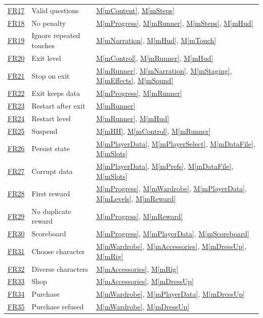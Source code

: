 \documentclass[12pt, titlepage]{article}
\newcommand{\mref}[1]{\hyperref[#1]{M\ref*{#1}}}
\newcommand{\srsurl}{https://team-hindsight.github.io/ophthamology-game/SRS/SRS.pdf}
\newcommand{\srsfrref}[2]{\href{\srsurl\#nameddest=#1}{FR#2}}
\begin{document}
\begin{longtable}{p{} p{} p{}}
\srsfrref{FR_ValidQuestions}{17} & Valid questions & \mref{mContent}, \mref{mSteps}\\
\srsfrref{FR_NoPenalty}{18} & No penalty & \mref{mProgress}, \mref{mRunner}, \mref{mSteps}, \mref{mHud}\\
\srsfrref{FR_IgnoreRepeatedTouches}{19} & Ignore repeated touches & \mref{mNarration}, \mref{mHud}, \mref{mTouch}\\
\srsfrref{FR_ExitLevel}{20} & Exit level & \mref{mControl}, \mref{mRunner}, \mref{mHud}\\
\srsfrref{FR_StopOnExit}{21} & Stop on exit & \mref{mRunner}, \mref{mNarration}, \mref{mStaging}, \mref{mEffects}, \mref{mSound}\\
\srsfrref{FR_ExitKeepsData}{22} & Exit keeps data & \mref{mProgress}, \mref{mRunner}\\
\srsfrref{FR_RestartAfterExit}{23} & Restart after exit & \mref{mRunner}\\
\srsfrref{FR_RestartLevel}{24} & Restart level & \mref{mRunner}, \mref{mHud}\\
\srsfrref{FR_Suspend}{25} & Suspend & \mref{mHH}, \mref{mControl}, \mref{mRunner}\\
\srsfrref{FR_PersistState}{26} & Persist state & \mref{mPlayerData}, \mref{mPlayerSelect}, \mref{mDataFile}, \mref{mSlots}\\
\srsfrref{FR_CorruptData}{27} & Corrupt data & \mref{mPlayerData}, \mref{mPrefs}, \mref{mDataFile}, \mref{mSlots}\\
\srsfrref{FR_FirstReward}{28} & First reward & \mref{mProgress}, \mref{mWardrobe}, \mref{mPlayerData}, \mref{mLevels}, \mref{mReward}\\
\srsfrref{FR_NoDuplicateReward}{29} & No duplicate reward & \mref{mProgress}, \mref{mReward}\\
\srsfrref{FR_Scoreboard}{30} & Scoreboard & \mref{mProgress}, \mref{mPlayerData}, \mref{mScoreboard}\\
\srsfrref{FR_ChooseCharacter}{31} & Choose character & \mref{mWardrobe}, \mref{mAccessories}, \mref{mDressUp}, \mref{mRig}\\
\srsfrref{FR_DiverseCharacters}{32} & Diverse characters & \mref{mAccessories}, \mref{mRig}\\
\srsfrref{FR_Shop}{33} & Shop & \mref{mAccessories}, \mref{mDressUp}\\
\srsfrref{FR_Purchase}{34} & Purchase & \mref{mWardrobe}, \mref{mPlayerData}, \mref{mDressUp}\\
\srsfrref{FR_PurchaseRefused}{35} & Purchase refused & \mref{mWardrobe}, \mref{mDressUp}\\

\end{longtable}
\end{document}
